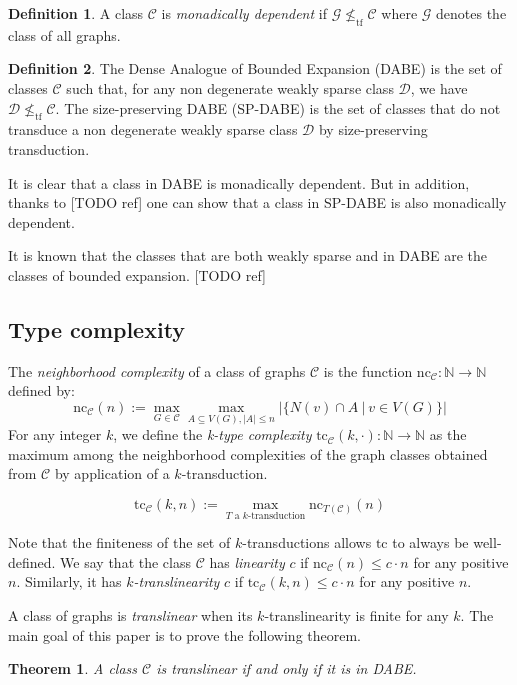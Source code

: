 \documentclass[11pt]{article}
\newtheorem{theorem}{Theorem}
\theoremstyle{definition}
\newtheorem{definition}{Definition}
\newcommand{\CC}{{\mathscr C}}
\newcommand{\DD}{{\mathscr D}}
\newcommand{\N}{\mathbb{N}}
\newcommand{\nc}{\text{nc}}
\newcommand{\tc}{\text{tc}}
\renewcommand{\le}{\leqslant}
\newcommand{\remph}[1]{{\color{red} \emph{#1}}}
\newcommand{\tf}{\leqslant_{\text{tf}}}
\begin{document}
\begin{definition}
A class $\CC$ is \remph{monadically dependent} if $\mathcal G \not \tf \CC$ where $\mathcal G$ denotes the class of all graphs.
\end{definition}

\begin{definition}
The Dense Analogue of Bounded Expansion (DABE) is the set of classes $\CC$ such that, for any non degenerate weakly sparse class $\DD$, we have $\DD \not \tf \CC$.
The size-preserving DABE (SP-DABE) is the set of classes that do not transduce a non degenerate weakly sparse class $\DD$ by size-preserving transduction.
\end{definition}

It is clear that a class in DABE is monadically dependent. But in addition, thanks to [TODO ref] one can show that a class in SP-DABE is also monadically dependent.

It is known that the classes that are both weakly sparse and in DABE are the classes of bounded expansion. [TODO ref]

\subsection{Type complexity}
The \remph{neighborhood complexity} of a class of graphs $\CC$ is the function $\nc_{\CC} : \N \to \N$ defined by:
\[
\nc_{\CC}(n) := \max_{G \in \CC} \max_{A \subseteq V(G), |A| \le n} |\{ N(v) \cap A~|~v \in V(G)\}|
\]
For any integer $k$, we define the \remph{k-type complexity }$\tc_{\CC}(k, \cdot) : \N \to \N$ as the maximum among the neighborhood complexities of the graph classes obtained from $\CC$ by application of a $k$-transduction.

\[
\tc_{\CC}(k, n) := \max_{T \text{ a $k$-transduction}} \nc_{T(\CC)}(n)
\]

Note that the finiteness of the set of $k$-transductions allows $\tc$ to always be well-defined.
We say that the class $\CC$ has \remph{linearity} $c$ if $\nc_{\CC}(n) \le c \cdot n$ for any positive $n$. Similarly, it has \remph{$k$-translinearity} $c$ if $\tc_{\CC}(k, n) \le c \cdot n$ for any positive $n$.

A class of graphs is \remph{translinear} when its $k$-translinearity is finite for any $k$.
The main goal of this paper is to prove the following theorem.

\begin{theorem}\label{thm:main}
  A class $\CC$ is translinear if and only if it is in DABE.
\end{theorem}
\end{document}
